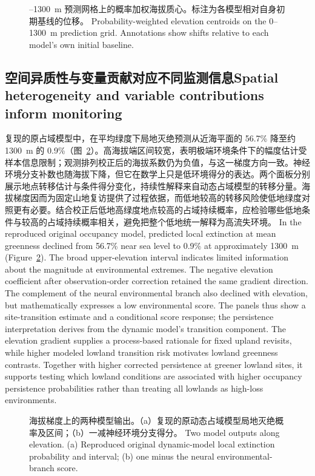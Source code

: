 \fi
\begin{figure}[htbp]\centering{}
\caption{--1300~m 预测网格上的概率加权海拔质心。标注为各模型相对自身初期基线的位移。
\else
Probability-weighted elevation centroids on the 0--1300~m prediction grid. Annotations show shifts relative to each model's own initial baseline.
\fi}\label{fig:cent}
\end{figure}
\FloatBarrier
\subsection{\ifzh 空间异质性与变量贡献对应不同监测信息\else Spatial heterogeneity and variable contributions inform monitoring\fi}
\ifzh
复现的原占域模型中，在平均绿度下局地灭绝预测从近海平面的 56.7\% 降至约 1300~m 的 0.9\%（图~\ref{fig:ext}）。高海拔端区间较宽，表明极端环境条件下的幅度估计受样本信息限制；观测排列校正后的海拔系数仍为负值，与这一梯度方向一致。神经环境分支补数也随海拔下降，但它在数学上只是低环境得分的表达。两个面板分别展示地点转移估计与条件得分变化，持续性解释来自动态占域模型的转移分量。海拔梯度因而为固定山地复访提供了过程依据，而低地较高的转移风险使低地绿度对照更有必要。结合校正后低地高绿度地点较高的占域持续概率，应检验哪些低地条件与较高的占域持续概率相关，避免把整个低地统一解释为高流失环境。
\else
In the reproduced original occupancy model, predicted local extinction at mean greenness declined from 56.7\% near sea level to 0.9\% at approximately 1300~m (Figure~\ref{fig:ext}). The broad upper-elevation interval indicates limited information about the magnitude at environmental extremes. The negative elevation coefficient after observation-order correction retained the same gradient direction. The complement of the neural environmental branch also declined with elevation, but mathematically expresses a low environmental score. The panels thus show a site-transition estimate and a conditional score response; the persistence interpretation derives from the dynamic model's transition component. The elevation gradient supplies a process-based rationale for fixed upland revisits, while higher modeled lowland transition risk motivates lowland greenness contrasts. Together with higher corrected persistence at greener lowland sites, it supports testing which lowland conditions are associated with higher occupancy persistence probabilities rather than treating all lowlands as high-loss environments.
\fi
\begin{figure}[htbp]\centering{}
\caption{\ifzh
海拔梯度上的两种模型输出。（a）复现的原动态占域模型局地灭绝概率及区间；（b）一减神经环境分支得分。
\else
Two model outputs along elevation. (a) Reproduced original dynamic-model local extinction probability and interval; (b) one minus the neural environmental-branch score.
\fi}\label{fig:ext}
\end{figure}
